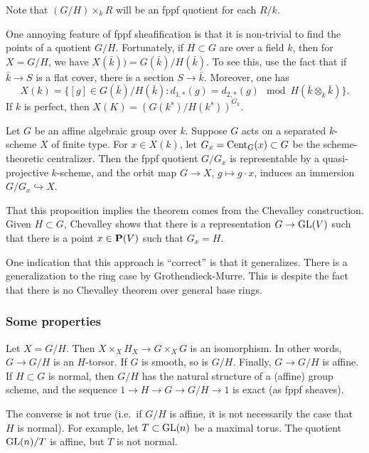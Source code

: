 Note that $(G/H)\times_k R$ will be an fppf quotient for each $R/k$. 

One annoying feature of fppf sheafification is that it is non-trivial to find 
the points of a quotient $G/H$. Fortunately, if $H\subset G$ are over a field 
$k$, then for $X=G/H$, we have $X(\bar k)) = G(\bar k)/H(\bar k)$. To see this, 
use the fact that if $\bar k\to S$ is a flat cover, there is a section 
$S\to \bar k$. Moreover, one has 
\[
  X(k) = \{[g]\in G(\bar k)/H(\bar k):d_{1,\ast}(g) = d_{2,\ast}(g)\mod H(\bar k\otimes_k \bar k)\} .
\]
If $k$ is perfect, then $X(K)=(G(k^s)/H(k^s))^{G_k}$. 

\begin{prop}
Let $G$ be an affine algebraic group over $k$. Suppose $G$ acts on a separated 
$k$-scheme $X$ of finite type. For $x\in X(k)$, let 
$G_x=\operatorname{Cent}_G(x)\subset G$ be the scheme-theoretic centralizer. Then the 
fppf quotient $G/G_x$ is representable by a quasi-projective $k$-scheme, and 
the orbit map $G\to X$, $g\mapsto g\cdot x$, induces an immersion 
$G/G_x\hookrightarrow X$. 
\end{prop}

That this proposition implies the theorem comes from the Chevalley construction. 
Given $H\subset G$, Chevalley shows that there is a representation 
$G\to \operatorname{GL}(V)$ such that there is a point 
$x\in \mathbf{P}(V)$ such that $G_x=H$. 

One indication that this approach is ``correct'' is that it generalizes. 
There is a generalization to the ring case by Grothendieck-Murre. This is 
despite the fact that there is no Chevalley theorem over general base rings. 


\subsubsection{Some properties}

Let $X=G/H$. Then $X\times_X H_X\to G\times_X G$ is an isomorphism. In other 
words, $G\to G/H$ is an $H$-torsor. If $G$ is smooth, so is $G/H$. Finally, 
$G\to G/H$ is affine. If $H\subset G$ is normal, then $G/H$ has the natural 
structure of a (affine) group scheme, and the sequence 
$1\to H \to G \to G/H \to 1$ is exact (as fppf sheaves). 

The converse is not true (i.e.\ if $G/H$ is affine, it is not necessarily the 
case that $H$ is normal). For example, let $T\subset \operatorname{GL}(n)$ be a 
maximal torus. The quotient $\operatorname{GL}(n)/T$ is affine, but $T$ is not 
normal. 

